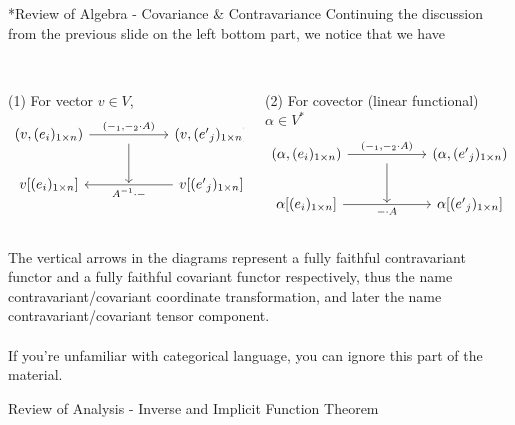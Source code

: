 \documentclass[aspectratio=169]{beamer}
\begin{document}
\begin{frame}{*Review of Algebra - Covariance \& Contravariance}
Continuing the discussion from the previous slide on the left bottom part, we notice that we have
\\~\\
\vspace{.3cm}
\begin{columns}
\begin{column}{0.5\textwidth}
(1) For vector $v\in V$,
$$
\begin{tikzcd}[ampersand replacement=\&]
(v,(e_i)_{1\times n}) \arrow[rr, "{(-_1,-_2\cdot A)}"] \&{}\arrow[d] \& (v,({e'}_j)_{1\times n})                                 \\
{v[(e_i)_{1\times n}]}                   \&      {}    \& {v[({e'}_j)_{1\times n}]} \arrow[ll, "A^{-1}\cdot-"]
\end{tikzcd}
$$
\end{column}
\begin{column}{0.5\textwidth}
(2) For covector (linear functional) $\alpha\in V^*$
$$
\begin{tikzcd}[ampersand replacement=\&]
(\alpha,(e_i)_{1\times n}) \arrow[rr, "{(-_1,-_2\cdot A)}"]            \&{}\arrow[d] \& (\alpha,({e'}_j)_{1\times n})           \\
{\alpha[(e_i)_{1\times n}]} \arrow[rr, "-\cdot A"'] \&  {}        \& {\alpha[({e'}_j)_{1\times n}]}
\end{tikzcd}
$$
\end{column}
\end{columns}
The vertical arrows in the diagrams represent a fully faithful \alert{contravariant functor} and a fully faithful \alert{covariant functor} respectively, thus the name contravariant/covariant \alert{coordinate transformation}, and later the name contravariant/covariant \alert{tensor component}.
\\~\\
If you're unfamiliar with categorical language, you can ignore this part of the material.
\end{frame}
\begin{frame}{Review of Analysis - Inverse and Implicit Function Theorem}
\end{frame}
\end{document}
